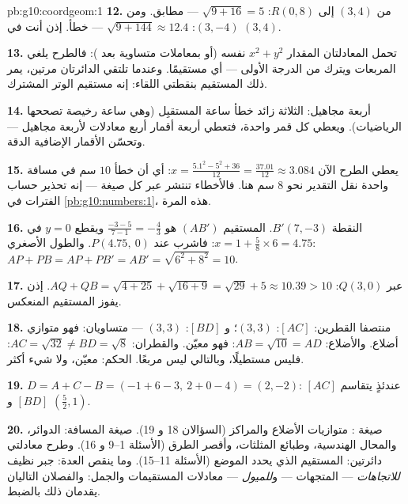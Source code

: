 \begin{solution}{pb:g10:coordgeom:1}
\textbf{12.} من $(3, 4)$ إلى $R(0, 8)$:
$\sqrt{9 + 16} = 5$ --- مطابق. ومن $(3, -4)$:
$\sqrt{9 + 144} \approx 12.4$ --- خطأ. إذن أنت في $(3, 4)$.

\textbf{13.} تحمل المعادلتان المقدار $x^2 + y^2$ نفسه (أو بمعاملات
متساوية بعد ): فالطرح يلغي
المربعات ويترك  من الدرجة الأولى --- أي مستقيمًا. وعندما
تلتقي الدائرتان مرتين، يمر ذلك المستقيم بنقطتي
اللقاء: إنه مستقيم الوتر المشترك.

\textbf{14.} أربعة مجاهيل:  الثلاثة زائد
خطأ ساعة المستقبِل (وهي ساعة رخيصة تصححها
الرياضيات). ويعطي كل قمر  واحدة، فتعطي أربعة
أقمار أربع معادلات لأربعة مجاهيل --- وتحسّن الأقمار
الإضافية الدقة.

\textbf{15.} يعطي الطرح الآن
$x = \frac{5.1^2 - 5^2 + 36}{12} = \frac{37.01}{12} \approx
3.084$: أي أن خطأ $10$ سم في مسافة واحدة نقل التقدير
نحو $8$ سم هنا. فالأخطاء تنتشر عبر كل صيغة ---
إنه تحذير حساب الفترات في \cref{pb:g10:numbers:1}،
 هذه المرة.

\textbf{16.} النقطة $B' (7, -3)$.  المستقيم $(AB')$ هو
$\frac{-3 - 5}{7 - 1} = -\frac43$ ويقطع $y = 0$ في
$x = 1 + \frac{5}{8} \times 6 = 4.75$: فاشرب عند
$P(4.75,\ 0)$. والطول الأصغري: $AP + PB = AP + PB' = AB' =
\sqrt{6^2 + 8^2} = 10$.

\textbf{17.} عبر $Q(3, 0)$:
$AQ + QB = \sqrt{4 + 25} + \sqrt{16 + 9} = \sqrt{29} + 5
\approx 10.39 > 10$. إذن يفوز المستقيم المنعكس.

\textbf{18.} منتصفا القطرين: $[AC]$: $(3, 3)$؛ و $[BD]$:
$(3, 3)$ --- متساويان: فهو متوازي أضلاع. والأضلاع:
$AB = \sqrt{10} = AD$: فهو معيّن. والقطران:
$AC = \sqrt{32} \neq BD = \sqrt{8}$: فليس مستطيلًا، وبالتالي
ليس مربعًا. الحكم: معيّن، ولا شيء أكثر.

\textbf{19.} $D = A + C - B = (-1 + 6 - 3,\ 2 + 0 - 4) =
(2, -2)$: عندئذٍ يتقاسم $[AC]$ و $[BD]$ 
$\left(\frac52, 1\right)$.

\textbf{20.} صيغة : متوازيات الأضلاع والمراكز
(السؤالان 18 و 19). صيغة المسافة: الدوائر، والمحال الهندسية، وطبائع
المثلثات، وأقصر الطرق (الأسئلة 1--9 و 16). وطرح
معادلتي دائرتين: المستقيم الذي يحدد الموضع (الأسئلة
11--15). وما ينقص العدة: جبر نظيف
\emph{للاتجاهات} --- المتجهات --- و\emph{للميول} ---
معادلات المستقيمات والجمل: والفصلان التاليان يقدمان
ذلك بالضبط.
\end{solution}
